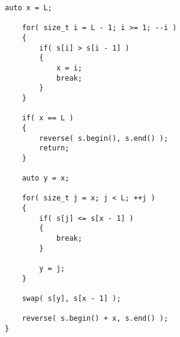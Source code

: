 \begin{lstlisting}[style=customc, caption={Next Permutation}]
    auto x = L;

    for( size_t i = L - 1; i >= 1; --i )
    {
        if( s[i] > s[i - 1] )
        {
            x = i;
            break;
        }
    }

    if( x == L )
    {
        reverse( s.begin(), s.end() );
        return;
    }

    auto y = x;

    for( size_t j = x; j < L; ++j )
    {
        if( s[j] <= s[x - 1] )
        {
            break;
        }

        y = j;
    }

    swap( s[y], s[x - 1] );

    reverse( s.begin() + x, s.end() );
}

\end{lstlisting}